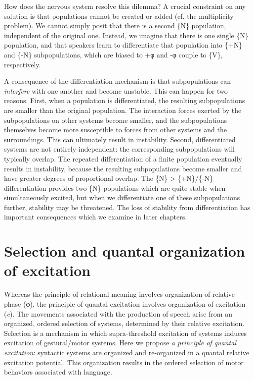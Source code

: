   How does the nervous system resolve this dilemma? A crucial constraint on any solution is that populations cannot be created or added (cf. the multiplicity problem). We cannot simply posit that there is a second \{N\} population, independent of the original one. Instead, we imagine that there is one single \{N\} population, and that speakers learn to differentiate that population into \{+N\} and \{-N\} subpopulations, which are biased to +φ and -φ couple to \{V\}, respectively.

  A consequence of the differentiation mechanism is that subpopulations can \textit{interfere} with one another and become unstable. This can happen for two reasons. First, when a population is differentiated, the resulting subpopulations are smaller than the original population. The interaction forces exerted by the subpopulations on other systems become smaller, and the subpopulations themselves become more susceptible to forces from other systems and the surroundings. This can ultimately result in instability. Second, differentiated systems are not entirely independent: the corresponding subpopulations will typically overlap. The repeated differentiation of a finite population eventually results in instability, because the resulting subpopulations become smaller and have greater degrees of proportional overlap. The \{N\} > \{+N\}/\{-N\} differentiation provides two \{N\} populations which are quite stable when simultaneously excited, but when we differentiate one of these subpopulations further, stability may be threatened. The loss of stability from differentiation has important consequences which we examine in later chapters.

\section{Selection and quantal organization of excitation}

Whereas the principle of relational meaning involves organization of relative phase (φ), the principle of quantal excitation involves organization of excitation (\textit{e}). The movements associated with the production of speech arise from an organized, ordered selection of systems, determined by their relative excitation. Selection is a mechanism in which supra-threshold excitation of systems induces excitation of gestural/motor systems. Here we propose \textit{a principle of quantal excitation}: syntactic systems are organized and re-organized in a quantal relative excitation potential. This organization results in the ordered selection of motor behaviors associated with language.

